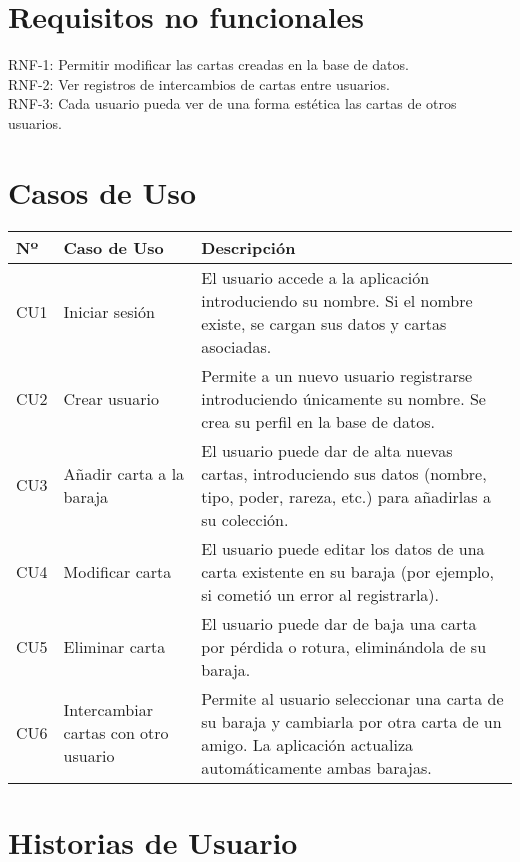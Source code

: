 \documentclass[12pt]{article}
\begin{document}
\section*{Requisitos no funcionales}

RNF-1: Permitir modificar las cartas creadas en la base de datos.\\
RNF-2: Ver registros de intercambios de cartas entre usuarios.\\
RNF-3: Cada usuario pueda ver de una forma estética las cartas de otros usuarios.

\section*{Casos de Uso}

\begin{tabular}{|p{1cm}|p{4cm}|p{10cm}|}
\hline
\textbf{Nº} & \textbf{Caso de Uso} & \textbf{Descripción} \\
\hline
CU1 & Iniciar sesión & El usuario accede a la aplicación introduciendo su nombre. Si el nombre existe, se cargan sus datos y cartas asociadas. \\
\hline
CU2 & Crear usuario & Permite a un nuevo usuario registrarse introduciendo únicamente su nombre. Se crea su perfil en la base de datos. \\
\hline
CU3 & Añadir carta a la baraja & El usuario puede dar de alta nuevas cartas, introduciendo sus datos (nombre, tipo, poder, rareza, etc.) para añadirlas a su colección. \\
\hline
CU4 & Modificar carta & El usuario puede editar los datos de una carta existente en su baraja (por ejemplo, si cometió un error al registrarla). \\
\hline
CU5 & Eliminar carta & El usuario puede dar de baja una carta por pérdida o rotura, eliminándola de su baraja. \\
\hline
CU6 & Intercambiar cartas con otro usuario & Permite al usuario seleccionar una carta de su baraja y cambiarla por otra carta de un amigo. La aplicación actualiza automáticamente ambas barajas. \\
\hline
\end{tabular}

\section*{Historias de Usuario}
\end{document}
